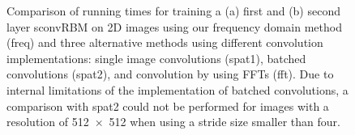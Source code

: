\begin{figure}[t!]


\caption[Comparison of running times for training a sconvRBMs on 2D
images]{Comparison of running times for training a (a) first and (b) second
layer sconvRBM on 2D images using our frequency domain method (freq) and three
alternative methods using different convolution implementations: single image
convolutions (spat1), batched convolutions (spat2), and convolution by using
FFTs (fft). Due to internal limitations of the implementation of batched
convolutions, a comparison with spat2 could not be performed for images with a
resolution of \num{512x512} when using a stride size smaller than four.}
\label{fig:run_imgnet}
\end{figure}

